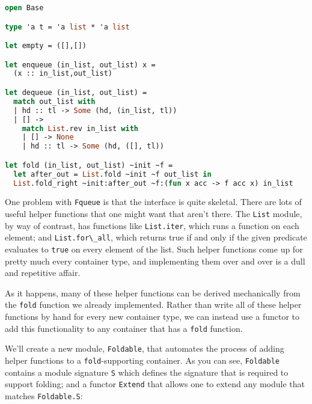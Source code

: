 \begin{lstlisting}[language=Caml]
open Base

type 'a t = 'a list * 'a list

let empty = ([],[])

let enqueue (in_list, out_list) x =
  (x :: in_list,out_list)

let dequeue (in_list, out_list) =
  match out_list with
  | hd :: tl -> Some (hd, (in_list, tl))
  | [] ->
    match List.rev in_list with
    | [] -> None
    | hd :: tl -> Some (hd, ([], tl))

let fold (in_list, out_list) ~init ~f =
  let after_out = List.fold ~init ~f out_list in
  List.fold_right ~init:after_out ~f:(fun x acc -> f acc x) in_list
\end{lstlisting}

One problem with \passthrough{\lstinline!Fqueue!} is that the interface
is quite skeletal. There are lots of useful helper functions that one
might want that aren't there. The \passthrough{\lstinline!List!} module,
by way of contrast, has functions like
\passthrough{\lstinline!List.iter!}, which runs a function on each
element; and \passthrough{\lstinline!List.for\_all!}, which returns true
if and only if the given predicate evaluates to
\passthrough{\lstinline!true!} on every element of the list. Such helper
functions come up for pretty much every container type, and implementing
them over and over is a dull and repetitive affair.

As it happens, many of these helper functions can be derived
mechanically from the \passthrough{\lstinline!fold!} function we already
implemented. Rather than write all of these helper functions by hand for
every new container type, we can instead use a functor to add this
functionality to any container that has a \passthrough{\lstinline!fold!}
function.

We'll create a new module, \passthrough{\lstinline!Foldable!}, that
automates the process of adding helper functions to a
\passthrough{\lstinline!fold!}-supporting container. As you can see,
\passthrough{\lstinline!Foldable!} contains a module signature
\passthrough{\lstinline!S!} which defines the signature that is required
to support folding; and a functor \passthrough{\lstinline!Extend!} that
allows one to extend any module that matches
\passthrough{\lstinline!Foldable.S!}:

